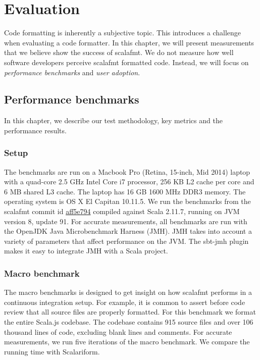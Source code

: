 \section{Evaluation}
Code formatting is inherently a subjective topic.
This introduces a challenge when evaluating a code formatter.
In this chapter, we will present measurements that we believe show the success of scalafmt.
We do not measure how well software developers perceive scalafmt formatted code.
Instead, we will focus on \emph{performance benchmarks} and \emph{user adoption}.

\subsection{Performance benchmarks}
In this chapter, we describe our test methodology, key metrics and the performance results.

\subsubsection{Setup}
The benchmarks are run on a Macbook Pro (Retina, 15-inch, Mid 2014) laptop with a quad-core 2.5 GHz Intel Core i7 processor, 256 KB L2 cache per core and 6 MB shared L3 cache.
The laptop has 16 GB 1600 MHz DDR3 memory.
The operating system is OS X El Capitan 10.11.5.
We run the benchmarks from the scalafmt commit id \href{https://github.com/olafurpg/scalafmt/tree/aff5e794dae4787b08243f8abb87a3ca4d907e40}{aff5e794} compiled against Scala 2.11.7, running on JVM version 8, update 91.
For accurate measurements, all benchmarks are run with the OpenJDK Java Microbenchmark Harness (JMH)\autocite{OpenJ38:online}.
JMH takes into account a variety of parameters that affect performance on the JVM.
The sbt-jmh\autocite{ktoso84:online} plugin makes it easy to integrate JMH with a Scala project.

\subsubsection{Macro benchmark}
The macro benchmarks is designed to get insight on how scalafmt performs in a continuous integration setup.
For example, it is common to assert before code review that all source files are properly formatted.
For this benchmark we format the entire Scala.js codebase.
The codebase contains 915 source files and over 106 thousand lines of code, excluding blank lines and comments.
For accurate measurements, we run five iterations of the macro benchmark.
We compare the running time with Scalariform.

